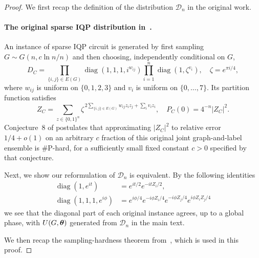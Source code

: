 \documentclass{article}
\theoremstyle{plain}
\theoremstyle{definition}
\theoremstyle{remark}
\begin{document}
\begin{proof}
We first recap the definition of the distribution $\mathcal{D}_n$ in the original work.

\paragraph{The original sparse IQP distribution in~\cite[Section~2]{Bremner17}.}
An instance of sparse IQP circuit is generated by first sampling $G\sim G(n,c\ln n/n)$ and then choosing, independently conditional on $G$,
\begin{equation} \label{eq:diagonal-circuit-BMS17}
    D_C=\prod_{\{i,j\}\in E(G)}\operatorname{diag}(1,1,1,i^{w_{ij}}) \prod_{i=1}^n\operatorname{diag}(1,\zeta^{v_i}), \quad \zeta=e^{\pi i/4}, 
\end{equation}
where $w_{ij}$ is uniform on $\{0,1,2,3\}$ and $v_i$ is uniform on $\{0,\ldots,7\}$. Its partition function satisfies
\begin{equation}\label{eq:partition-function}
    Z_C=\sum_{z\in\{0,1\}^n} \zeta^{\,2\sum_{\{i,j\}\in E(G)}w_{ij}z_iz_j+\sum_i v_iz_i}, \quad P_C(0)=4^{-n}|Z_C|^2.
\end{equation}
Conjecture~8 of \cite{Bremner17} postulates that approximating $|Z_C|^2$ to relative error $1/4+o(1)$ on an arbitrary $c$ fraction of this original joint graph-and-label ensemble is \#P-hard, for a sufficiently small fixed constant $c>0$ specified by that conjecture.

Next, we show our reformulation of $\mathcal{D}_n$ is equivalent. By the following identities
\begin{align*}
 \operatorname{diag}(1,e^{it})
 &=e^{it/2}e^{-itZ_i/2},\\
 \operatorname{diag}(1,1,1,e^{i\phi})
 &=e^{i\phi/4}e^{-i\phi Z_i/4}e^{-i\phi Z_j/4}e^{i\phi Z_iZ_j/4}
\end{align*}
we see that the diagonal part of each original instance agrees, up to a global phase, with $U(G,{\bm{\theta}})$ generated from $\mathcal{D}_n$ in the main text.

We then recap the sampling-hardness theorem from~\cite{Bremner17}, which is used in this proof. 
    

\end{proof}
\end{document}
